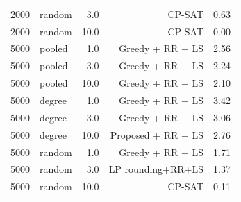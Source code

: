 \begin{table}[t]
\begin{tabular}{llrrr}
2000 & random & 3.0 & CP-SAT & 0.63 \\
2000 & random & 10.0 & CP-SAT & 0.00 \\
5000 & pooled & 1.0 & Greedy + RR + LS & 2.56 \\
5000 & pooled & 3.0 & Greedy + RR + LS & 2.24 \\
5000 & pooled & 10.0 & Greedy + RR + LS & 2.10 \\
5000 & degree & 1.0 & Greedy + RR + LS & 3.42 \\
5000 & degree & 3.0 & Greedy + RR + LS & 3.06 \\
5000 & degree & 10.0 & Proposed + RR + LS & 2.76 \\
5000 & random & 1.0 & Greedy + RR + LS & 1.71 \\
5000 & random & 3.0 & LP rounding+RR+LS & 1.37 \\
5000 & random & 10.0 & CP-SAT & 0.11 \\
\bottomrule
\end{tabular}
\end{table}
